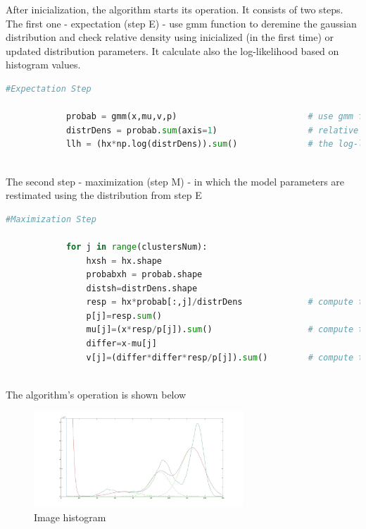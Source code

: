 After inicialization, the algorithm starts its operation. It consists of two steps. The first one - expectation (step E) - use gmm function to deremine the gaussian distribution and check relative density using inicialized (in the first time) or updated distribution parameters. It calculate also the log-likelihood based on histogram values. 

\begin{lstlisting}[language=Python, caption = PGeting part of image to segmentation]
#Expectation Step

            probab = gmm(x,mu,v,p)							# use gmm function - get probability
            distrDens = probab.sum(axis=1)					# relative density 
            llh = (hx*np.log(distrDens)).sum()				# the log-likelihood base on histogram data
\end{lstlisting}\\

The second step - maximization (step M) -  in which the model parameters are restimated using the distribution from step E



\begin{lstlisting}[language=Python, caption = PGeting part of image to segmentation]
#Maximization Step

            for j in range(clustersNum):
                hxsh = hx.shape
                probabxh = probab.shape
                distsh=distrDens.shape
                resp = hx*probab[:,j]/distrDens				# compute the responsibilities
                p[j]=resp.sum()
                mu[j]=(x*resp/p[j]).sum()					# compute the weighted of expected values
                differ=x-mu[j]
                v[j]=(differ*differ*resp/p[j]).sum()		# compute the weighted varainces	
\end{lstlisting}\\

The algorithm's operation is shown below 

\begin{figure}[H]
	\centering{}\includegraphics[width=0.7\textwidth]{figures/Module_09/m09_13}
	\caption{Image histogram  
	\label{fig:figures/m09_13}}
\end{figure} 

